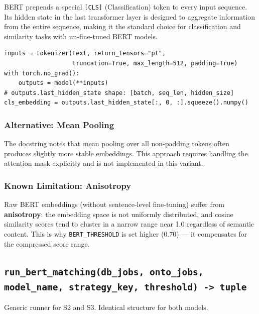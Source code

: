 ﻿\documentclass[12pt,a4paper]{article}
\begin{document}
BERT prepends a special \texttt{[CLS]} (Classification) token to every input sequence. Its hidden state in the last transformer layer is designed to aggregate information from the entire sequence, making it the standard choice for classification and similarity tasks with un-fine-tuned BERT models.

\begin{lstlisting}
inputs = tokenizer(text, return_tensors="pt",
                   truncation=True, max_length=512, padding=True)
with torch.no_grad():
    outputs = model(**inputs)
# outputs.last_hidden_state shape: [batch, seq_len, hidden_size]
cls_embedding = outputs.last_hidden_state[:, 0, :].squeeze().numpy()
\end{lstlisting}

\subsubsection*{Alternative: Mean Pooling}

The docstring notes that mean pooling over all non-padding tokens often produces slightly more stable embeddings. This approach requires handling the attention mask explicitly and is not implemented in this variant.

\subsubsection*{Known Limitation: Anisotropy}
Raw BERT embeddings (without sentence-level fine-tuning) suffer from \textbf{anisotropy}: the embedding space is not uniformly distributed, and cosine similarity scores tend to cluster in a narrow range near 1.0 regardless of semantic content. This is why \texttt{BERT\_THRESHOLD} is set higher (0.70) --- it compensates for the compressed score range.

\subsection{\texttt{run\_bert\_matching(db\_jobs, onto\_jobs, model\_name, strategy\_key, threshold) -> tuple}}

Generic runner for S2 and S3. Identical structure for both models.
\end{document}
